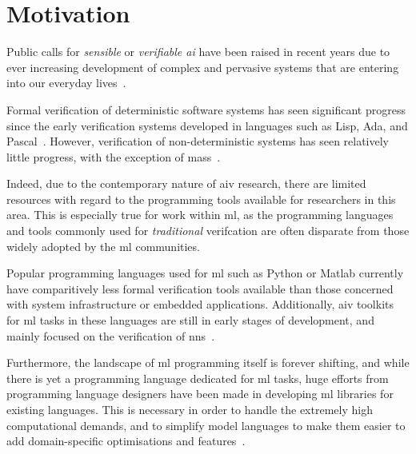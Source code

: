 \section{Motivation}

Public calls for \textit{sensible} or \textit{verifiable \Gls{ai}} have been raised in recent years due to ever increasing
development of complex and pervasive systems that are entering into our everyday lives~\citep{russell2016}.

Formal verification of deterministic software systems has seen significant progress since the early
verification systems developed in languages such as Lisp, Ada, and Pascal~\citep{polak1979, boyer1990, guaspari1993}. However,
verification of non-deterministic systems has seen relatively little progress, with the exception of
\Glspl{mas}~\citep{lomuscio2017, kouvaros2016}.

Indeed, due to the contemporary nature of \gls{aiv} research, there are limited resources with regard to the 
programming tools available for researchers in this area. This is especially true for work
within \gls{ml}, as the programming languages and tools commonly used for \textit{traditional} verifcation are often
disparate from those widely adopted by the \gls{ml} communities. 

Popular programming languages used for \gls{ml} such as Python or Matlab currently have comparitively less
formal verification tools available than those concerned with system infrastructure or embedded applications.
Additionally, \gls{aiv} toolkits for \gls{ml} tasks in these languages are still in early stages of development, and mainly focused
on the verification of \glspl{nn}~\citep{kokke2020}. 

Furthermore, the landscape of \gls{ml} programming itself is forever shifting, and while there is yet a programming 
language dedicated for \gls{ml} tasks, huge efforts from programming language designers have been made 
in developing \gls{ml} libraries for existing languages. This is necessary in order to handle the 
extremely high computational demands, and to simplify 
model languages to make them easier to add domain-specific optimisations and features~\citep{innes2017}.

